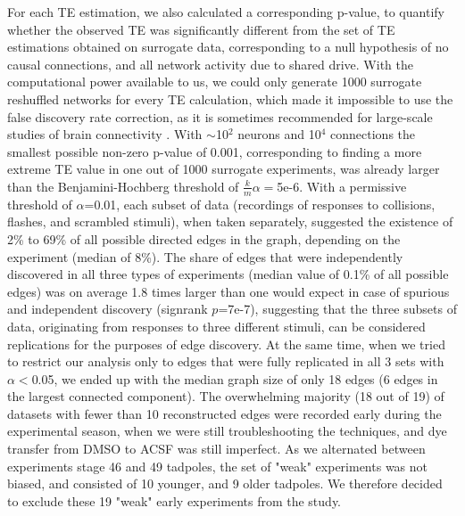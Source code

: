 \documentclass{article}
\begin{document}
For each TE estimation, we also calculated a corresponding p-value, to quantify whether the observed TE was significantly different from the set of TE estimations obtained on surrogate data, corresponding to a null hypothesis of no causal connections, and all network activity due to shared drive. With the computational power available to us, we could only generate 1000 surrogate reshuffled networks for every TE calculation, which made it impossible to use the false discovery rate correction, as it is sometimes recommended for large-scale studies of brain connectivity \citep{vicente2011te,lindner2011trentool}. With $\sim$10$^2$ neurons and 10$^4$ connections the smallest possible non-zero p-value of 0.001, corresponding to finding a more extreme TE value in one out of 1000 surrogate experiments, was already larger than the Benjamini-Hochberg threshold of $\frac{k}{m}\alpha=$5e-6. With a permissive threshold of $\alpha$=0.01, each subset of data (recordings of responses to collisions, flashes, and scrambled stimuli), when taken separately, suggested the existence of 2\% to 69\% of all possible directed edges in the graph, depending on the experiment (median of 8\%). The share of edges that were independently discovered in all three types of experiments (median value of 0.1\% of all possible edges) was on average 1.8 times larger than one would expect in case of spurious and independent discovery (signrank $p$=7e-7), suggesting that the three subsets of data, originating from responses to three different stimuli, can be considered replications for the purposes of edge discovery. At the same time, when we tried to restrict our analysis only to edges that were fully replicated in all 3 sets with $\alpha < $0.05, we ended up with the median graph size of only 18 edges (6 edges in the largest connected component). The overwhelming majority (18 out of 19) of datasets with fewer than 10 reconstructed edges were recorded early during the experimental season, when we were still troubleshooting the techniques, and dye transfer from DMSO to ACSF was still imperfect. As we alternated between experiments stage 46 and 49 tadpoles, the set of "weak" experiments was not biased, and consisted of 10 younger, and 9 older tadpoles. We therefore decided to exclude these 19 "weak" early experiments from the study.
\end{document}
